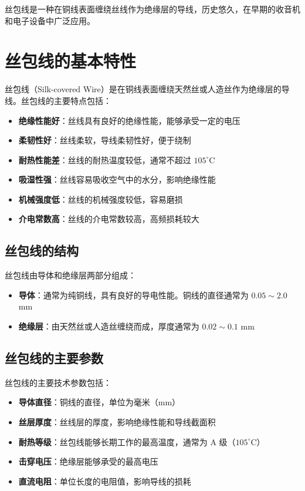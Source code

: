 \documentclass[12pt,UTF8]{ctexbook}
\begin{document}
丝包线是一种在铜线表面缠绕丝线作为绝缘层的导线，历史悠久，在早期的收音机和电子设备中广泛应用。

\section{丝包线的基本特性}

丝包线（Silk-covered Wire）是在铜线表面缠绕天然丝或人造丝作为绝缘层的导线。丝包线的主要特点包括：

\begin{itemize}[leftmargin=2cm]
    \item \textbf{绝缘性能好}：丝线具有良好的绝缘性能，能够承受一定的电压
    \item \textbf{柔韧性好}：丝线柔软，导线柔韧性好，便于绕制
    \item \textbf{耐热性能差}：丝线的耐热温度较低，通常不超过 $105^\circ$C
    \item \textbf{吸湿性强}：丝线容易吸收空气中的水分，影响绝缘性能
    \item \textbf{机械强度低}：丝线的机械强度较低，容易磨损
    \item \textbf{介电常数高}：丝线的介电常数较高，高频损耗较大
\end{itemize}

\subsection{丝包线的结构}

丝包线由导体和绝缘层两部分组成：

\begin{itemize}[leftmargin=2cm]
    \item \textbf{导体}：通常为纯铜线，具有良好的导电性能。铜线的直径通常为 $0.05 \sim 2.0$ mm
    \item \textbf{绝缘层}：由天然丝或人造丝缠绕而成，厚度通常为 $0.02 \sim 0.1$ mm
\end{itemize}

\subsection{丝包线的主要参数}

丝包线的主要技术参数包括：

\begin{itemize}[leftmargin=2cm]
    \item \textbf{导体直径}：铜线的直径，单位为毫米（mm）
    \item \textbf{丝层厚度}：丝线层的厚度，影响绝缘性能和导线截面积
    \item \textbf{耐热等级}：丝包线能够长期工作的最高温度，通常为 A 级（$105^\circ$C）
    \item \textbf{击穿电压}：绝缘层能够承受的最高电压
    \item \textbf{直流电阻}：单位长度的电阻值，影响导线的损耗
\end{itemize}
\end{document}

